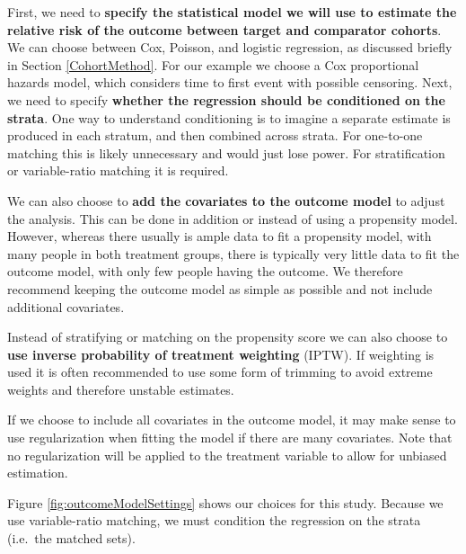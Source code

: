 \documentclass[11pt]{book}
\theoremstyle{definition}
\theoremstyle{definition}
\theoremstyle{definition}
\theoremstyle{remark}
\begin{document}
First, we need to \textbf{specify the statistical model we will use to estimate the relative risk of the outcome between target and comparator cohorts}. We can choose between Cox, Poisson, and logistic regression, as discussed briefly in Section \ref{CohortMethod}. For our example we choose a Cox proportional hazards model, which considers time to first event with possible censoring. Next, we need to specify \textbf{whether the regression should be conditioned on the strata}. One way to understand conditioning is to imagine a separate estimate is produced in each stratum, and then combined across strata. For one-to-one matching this is likely unnecessary and would just lose power. For stratification or variable-ratio matching it is required.  

We can also choose to \textbf{add the covariates to the outcome model} to adjust the analysis. This can be done in addition or instead of using a propensity model. However, whereas there usually is ample data to fit a propensity model, with many people in both treatment groups, there is typically very little data to fit the outcome model, with only few people having the outcome. We therefore recommend keeping the outcome model as simple as possible and not include additional covariates.

Instead of stratifying or matching on the propensity score we can also choose to \textbf{use inverse probability of treatment weighting} (IPTW). If weighting is used it is often recommended to use some form of trimming to avoid extreme weights and therefore unstable estimates.

If we choose to include all covariates in the outcome model, it may make sense to use regularization when fitting the model if there are many covariates. Note that no regularization will be applied to the treatment variable to allow for unbiased estimation.

Figure \ref{fig:outcomeModelSettings} shows our choices for this study. Because we use variable-ratio matching, we must condition the regression on the strata (i.e.~the matched sets).
\end{document}
